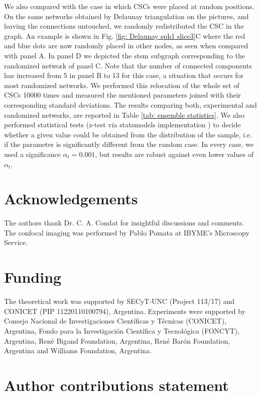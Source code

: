 \documentclass[fleqn,10pt]{wlscirep}
\begin{document}
We also compared with the case in which CSCs were placed at random positions. On the same networks obtained by Delaunay triangulation on the pictures, and leaving the connections untouched, we randomly redistributed the CSC in the graph. An example is shown in Fig. \ref{fig: Delaunay sph1 slice3}C where the red and blue dots are now randomly placed in other nodes, as seen when compared with panel A. In panel D we depicted the stem subgraph corresponding to the randomized network of panel C. Note that the number of connected components has increased from 5 in panel B to 13 for this case, a situation that occurs for most randomized networks. We performed this relocation of the whole set of CSCs 10000 times and measured the mentioned parameters joined with their corresponding standard deviations. The results comparing both, experimental and randomized networks, are reported in Table \ref{tab: ensemble statistics}. We also performed statistical tests (z-test via \textsf{statsmodels} implementation \cite{seabold2010statsmodels}) to decide whether a given value could be obtained from the distribution of the sample, i.e. if the parameter is significantly different from the random case. In every case, we used a significance $\alpha_{t}=0.001$, but results are robust against even lower values of $\alpha_{t}$.





\section*{Acknowledgements }
The authors thank Dr. C. A. Condat for insightful discussions and comments. The confocal imaging was performed by Pablo Pomata at IBYME's Microscopy Service.

\section*{Funding}The theoretical work was supported by SECyT-UNC (Project 113/17) and CONICET (PIP 11220110100794), Argentina. Experiments were supported by  Consejo Nacional de Investigaciones Científicas y Técnicas (CONICET), Argentina, Fondo para la Investigación Científica y Tecnológica (FONCYT), Argentina, René Bigand Foundation, Argentina, René Barón Foundation, Argentina and Williams Foundation, Argentina.



\section*{Author contributions statement}
\end{document}
